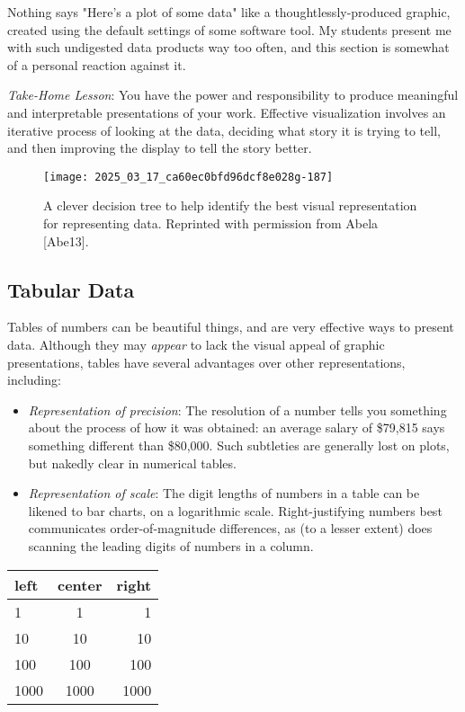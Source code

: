 \documentclass[10pt]{article}
\begin{document}
Nothing says "Here's a plot of some data" like a thoughtlessly-produced graphic, created using the default settings of some software tool. My students present me with such undigested data products way too often, and this section is somewhat of a personal reaction against it.

\emph{Take-Home Lesson}: You have the power and responsibility to produce meaningful and interpretable presentations of your work. Effective visualization involves an iterative process of looking at the data, deciding what story it is trying to tell, and then improving the display to tell the story better.

\begin{figure}[h]
  \centering
  \texttt{[image: 2025\_03\_17\_ca60ec0bfd96dcf8e028g-187]}
  \caption{A clever decision tree to help identify the best visual representation for representing data. Reprinted with permission from Abela [Abe13].}
\end{figure}

\subsection{Tabular Data}
Tables of numbers can be beautiful things, and are very effective ways to present data. Although they may \emph{appear} to lack the visual appeal of graphic presentations, tables have several advantages over other representations, including:
\begin{itemize}
  \item \emph{Representation of precision}: The resolution of a number tells you something about the process of how it was obtained: an average salary of \$79,815 says something different than \$80,000. Such subtleties are generally lost on plots, but nakedly clear in numerical tables.
  \item \emph{Representation of scale}: The digit lengths of numbers in a table can be likened to bar charts, on a logarithmic scale. Right-justifying numbers best communicates order-of-magnitude differences, as (to a lesser extent) does scanning the leading digits of numbers in a column.
\end{itemize}

\begin{center}
\begin{tabular}{lcr}
left & center & right \\
\hline
1 & 1 & 1 \\
10 & 10 & 10 \\
100 & 100 & 100 \\
1000 & 1000 & 1000 \\
\hline
\end{tabular}
\end{center}
\end{document}
